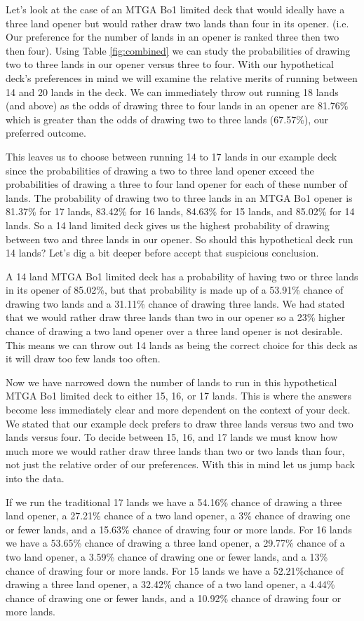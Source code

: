 \documentclass[oneside]{book}   %
\begin{document}
Let's look at the case of an MTGA Bo1 limited deck that would ideally have a three land opener but would rather draw two lands than four in its opener. (i.e. Our preference for the number of lands in an opener is ranked three then two then four). Using Table \ref{fig:combined} we can study the probabilities of drawing two to three lands in our opener versus three to four. With our hypothetical deck's preferences in mind we will examine the relative merits of running between 14 and 20 lands in the deck. We can immediately throw out running 18 lands (and above) as the odds of drawing three to four lands in an opener are 81.76\% which is greater than the odds of drawing two to three lands (67.57\%), our preferred outcome. 

This leaves us to choose between running 14 to 17 lands in our example deck since the probabilities of drawing a two to three land opener exceed the probabilities of drawing a three to four land opener for each of these number of lands. The probability of drawing two to three lands in an MTGA Bo1 opener is 81.37\% for 17 lands, 83.42\% for 16 lands, 84.63\% for 15 lands, and 85.02\% for 14 lands. So a 14 land limited deck gives us the highest probability of drawing between two and three lands in our opener. So should this hypothetical deck run 14 lands? Let's dig a bit deeper before accept that suspicious conclusion. 

A 14 land MTGA Bo1 limited deck has a probability of having two or three lands in its opener of 85.02\%, but that probability is made up of a 53.91\% chance of drawing two lands and a 31.11\% chance of drawing three lands. We had stated that we would rather draw three lands than two in our opener so a 23\% higher chance of drawing a two land opener over a three land opener is not desirable. This means we can throw out 14 lands as being the correct choice for this deck as it will draw too few lands too often. 

Now we have narrowed down the number of lands to run in this hypothetical MTGA Bo1 limited deck to either 15, 16, or 17 lands. This is where the answers become less immediately clear and more dependent on the context of your deck. We stated that our example deck prefers to draw three lands versus two and two lands versus four. To decide between 15, 16, and 17 lands we must know how much more we would rather draw three lands than two or two lands than four, not just the relative order of our preferences. With this in mind let us jump back into the data.

If we run the traditional 17 lands we have a 54.16\% chance of drawing a three land opener, a 27.21\% chance of a two land opener, a 3\% chance of drawing one or fewer lands, and a 15.63\% chance of drawing four or more lands. For 16 lands we have a 53.65\% chance of drawing a three land opener, a 29.77\% chance of a two land opener, a 3.59\% chance of drawing one or fewer lands, and a 13\% chance of drawing four or more lands. For 15 lands we have a 52.21\%chance of drawing a three land opener, a 32.42\% chance of a two land opener, a 4.44\% chance of drawing one or fewer lands, and a 10.92\% chance of drawing four or more lands.
\end{document}
